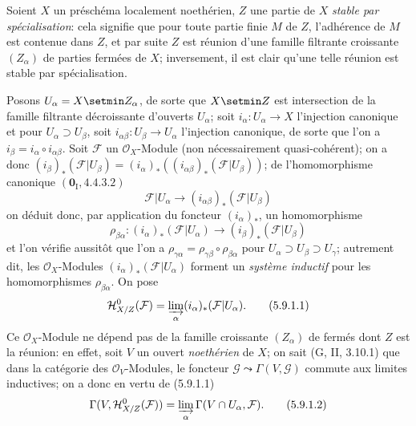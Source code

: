 \begin{env}[5.9.1]
\label{IV.2.s5.9.1-fr}
Soient $X$ un préschéma localement noethérien, $Z$ une partie de $X$
\emph{stable par spécialisation}: cela signifie que pour toute partie finie
$M$ de $Z$, l'adhérence de $M$ est contenue dans $Z$, et par suite $Z$ est
réunion d'une famille filtrante croissante $(Z_\alpha)$ de parties fermées de
$X$; inversement, il est clair qu'une telle réunion est stable par
spécialisation.

Posons $U_\alpha=X\setmin Z_\alpha$, de sorte que $X\setmin Z$ est intersection de la
famille filtrante décroissante d'ouverts $U_\alpha$; soit
$i_\alpha:U_\alpha\to X$ l'injection canonique et pour
$U_\alpha\supset U_\beta$, soit $i_{\alpha\beta}:U_\beta\to U_\alpha$
l'injection canonique, de sorte que l'on a
$i_\beta=i_\alpha\circ i_{\alpha\beta}$. Soit $\mathcal F$ un
$\mathcal O_X$-Module (non nécessairement quasi-cohérent); on a donc
$(i_\beta)_*(\mathcal F|U_\beta)
=(i_\alpha)_*((i_{\alpha\beta})_*(\mathcal F|U_\beta))$;
de l'homomorphisme canonique $(\mathbf{0}_{\mathrm I},4.4.3.2)$
\[
\mathcal F|U_\alpha\longrightarrow
(i_{\alpha\beta})_*(\mathcal F|U_\beta)
\]
on déduit donc, par application du foncteur $(i_\alpha)_*$, un homomorphisme
\[
\rho_{\beta\alpha}:(i_\alpha)_*(\mathcal F|U_\alpha)
\longrightarrow(i_\beta)_*(\mathcal F|U_\beta)
\]
et l'on vérifie aussitôt que l'on a
$\rho_{\gamma\alpha}=\rho_{\gamma\beta}\circ\rho_{\beta\alpha}$ pour
$U_\alpha\supset U_\beta\supset U_\gamma$; autrement dit, les
$\mathcal O_X$-Modules $(i_\alpha)_*(\mathcal F|U_\alpha)$ forment un
\emph{système inductif} pour les homomorphismes $\rho_{\beta\alpha}$.
On pose
\begin{equation}
\mathcal H^0_{X/Z}(\mathcal F)
=\varinjlim_\alpha(i_\alpha)_*(\mathcal F|U_\alpha).
\tag{5.9.1.1}\label{IV.2.s5.9.1.1-fr}
\end{equation}
Ce $\mathcal O_X$-Module ne dépend pas de la famille croissante
$(Z_\alpha)$ de fermés dont $Z$ est la réunion: en effet, soit $V$ un ouvert
\emph{noethérien} de $X$; on sait (G, II, 3.10.1) que dans la catégorie
des $\mathcal O_V$-Modules, le foncteur
$\mathcal G\leadsto\Gamma(V,\mathcal G)$ commute aux limites inductives; on a
donc en vertu de (5.9.1.1)
\begin{equation}
\Gamma(V,\mathcal H^0_{X/Z}(\mathcal F))
=\varinjlim_\alpha\Gamma(V\cap U_\alpha,\mathcal F).
\tag{5.9.1.2}\label{IV.2.s5.9.1.2-fr}
\end{equation}


\end{env}

